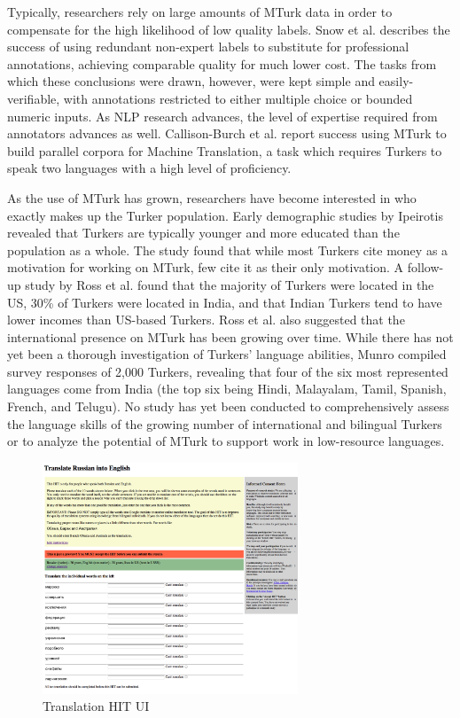 \documentclass[11pt]{article}
\begin{document}
Typically, researchers rely on large amounts of MTurk data in order to compensate for the high likelihood of low quality labels. Snow et al. describes the success of using redundant non-expert labels to substitute for professional annotations, achieving comparable quality for much lower cost. The tasks from which these conclusions were drawn, however, were kept simple and easily-verifiable, with annotations restricted to either multiple choice or bounded numeric inputs. As NLP research advances, the level of expertise required from annotators advances as well. Callison-Burch et al. report success using MTurk to build parallel corpora for Machine Translation, a task which requires Turkers to speak two languages with a high level of proficiency.

As the use of MTurk has grown, researchers have become interested in who exactly makes up the Turker population. Early demographic studies by Ipeirotis revealed that Turkers are typically younger and more educated than the population as a whole. The study found that while most Turkers cite money as a motivation for working on MTurk, few cite it as their only motivation. A follow-up study by Ross et al. found that the majority of Turkers were located in the US, 30\% of Turkers were located in India, and that Indian Turkers tend to have lower incomes than US-based Turkers. Ross et al. also suggested that the international presence on MTurk has been growing over time. While there has not yet been a thorough investigation of Turkers' language abilities, Munro compiled survey responses of 2,000 Turkers, revealing that four of the six most represented languages come from India (the top six being Hindi, Malayalam, Tamil, Spanish, French, and Telugu). No study has yet been conducted to comprehensively assess the language skills of the growing number of international and bilingual Turkers or to analyze the potential of MTurk to support work in low-resource languages. 


\begin{figure}[h]
\centering
\includegraphics[width=3in]{figures/vocabulary_hit_mturk}
\caption{Translation HIT UI}
\label{tranhit}
\end{figure}
\end{document}

